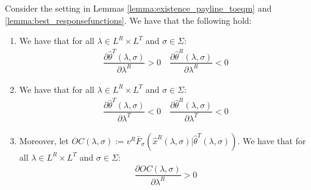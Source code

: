 \begin{lemma}\label{lemma:stable_fixedpayline_eqm}
Consider the setting in Lemmas \ref{lemma:existence_payline_toeqm} and \ref{lemma:best_responsefunctions}. We have that the following hold:
\vspace{-5pt}
\begin{enumerate}[label=(\arabic*),ref=\thelemma(\arabic*)]
   \item\label{lemma:lbdaR_increase} We have that for all $\lambda\in L^R\times L^T$ and $\sigma\in \Sigma$:
   \begin{align*}
      \dfrac{\partial \hat{\theta}^T(\lambda,\sigma) }{\partial \lambda^R} > 0 \quad \dfrac{\partial \hat{\theta}^R(\lambda,\sigma) }{\partial \lambda^R} < 0
   \end{align*}
   \item\label{lemma:lbdaT_increase} We have that for all $\lambda\in L^R\times L^T$ and $\sigma\in \Sigma$:
   \begin{align*}
      \dfrac{\partial \hat{\theta}^T(\lambda,\sigma) }{\partial \lambda^T} <0 \quad \dfrac{\partial \hat{\theta}^R(\lambda,\sigma) }{\partial \lambda^T} < 0 
   \end{align*}
   \item\label{lemma:OC_lbdaR} Moreover, let $OC(\lambda,\sigma) := v^R\bar{F}_{\sigma}(\hat{x}^R(\lambda,\sigma)|\hat{\theta}^T(\lambda,\sigma))$. We have that for all $\lambda\in L^R\times L^T$ and $\sigma\in \Sigma$:
  \begin{align*}
    \dfrac{\partial OC(\lambda,\sigma)}{\partial \lambda^R} > 0 
  \end{align*}
\end{enumerate}
\end{lemma}

